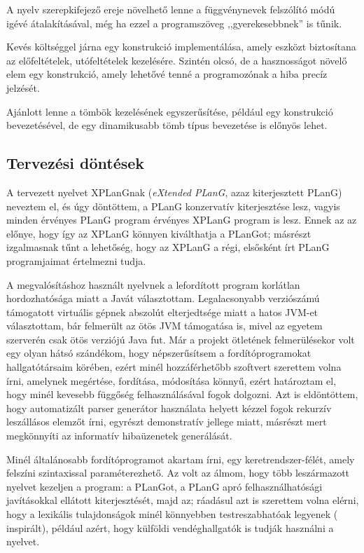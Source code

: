 A nyelv szerepkifejező ereje növelhető lenne a függvénynevek felszólító módú igévé átalakításával, még ha ezzel a programszöveg ,,gyerekesebbnek'' is tűnik.

Kevés költséggel járna egy  konstrukció implementálása, amely eszközt biztosítana az előfeltételek, utófeltételek kezelésére.
Szintén olcsó, de a hasznosságot növelő elem egy  konstrukció, amely lehetővé tenné a programozónak a hiba precíz jelzését.

Ajánlott lenne a tömbök kezelésének egyszerűsítése, például egy  konstrukció bevezetésével, de egy dinamikusabb tömb típus bevezetése is előnyös lehet.


\subsection{Tervezési döntések}\label{subsec:plans}
A tervezett nyelvet XPLanGnak (\textit{eXtended PLanG}, azaz kiterjesztett PLanG) neveztem el, és úgy döntöttem, a PLanG konzervatív kiterjesztése lesz, vagyis minden érvényes PLanG program érvényes XPLanG program is lesz.
Ennek az az előnye, hogy így az XPLanG könnyen kiválthatja a PLanGot; másrészt izgalmasnak tűnt a lehetőség, hogy az XPLanG a régi, elsősként írt PLanG programjaimat értelmezni tudja.

A megvalósításhoz használt nyelvnek a lefordított program korlátlan hordozhatósága miatt a Javát választottam.
Legalacsonyabb verziószámú támogatott virtuális gépnek abszolút elterjedtsége miatt a hatos JVM-et választottam, bár felmerült az ötös JVM támogatása is, mivel az egyetem  szerverén csak ötös verziójú Java fut.
Már a projekt ötletének felmerülésekor volt egy olyan hátsó szándékom, hogy népszerűsítsem a fordítóprogramokat hallgatótársaim körében, ezért minél hozzáférhetőbb szoftvert szerettem volna írni, amelynek megértése, fordítása, módosítása könnyű, ezért határoztam el, hogy minél kevesebb függőség felhasználásával fogok dolgozni.
Azt is eldöntöttem, hogy automatizált parser generátor használata helyett kézzel fogok rekurzív leszállásos elemzőt írni, egyrészt demonstratív jellege miatt, másrészt mert megkönnyíti az informatív hibaüzenetek generálását.

Minél általánosabb fordítóprogramot akartam írni, egy  keretrendszer-félét, amely felszíni szintaxissal paraméterezhető.
Az volt az álmom, hogy több leszármazott nyelvet kezeljen a program: a PLanGot, a PLanG apró felhasználhatósági javításokkal ellátott kiterjesztését, majd az; ráadásul azt is szerettem volna elérni, hogy a lexikális tulajdonságok minél könnyebben testreszabhatóak legyenek (\cite{Balogh12} inspirált), például azért, hogy külföldi vendéghallgatók is tudják használni a nyelvet.

